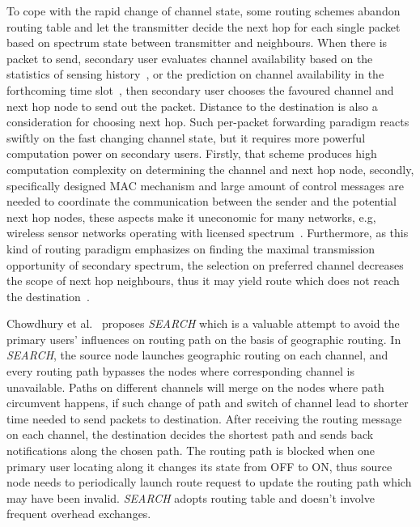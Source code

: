 To cope with the rapid change of channel state, some routing schemes abandon routing table and let the transmitter decide the next hop for each single packet based on spectrum state between transmitter and neighbours.
When there is packet to send, secondary user evaluates channel availability based on the statistics of sensing history~\cite{routing-crn-icc11}, or the prediction on channel availability in the forthcoming time slot~\cite{routing-crn-jsac12}, then secondary user chooses the favoured channel and next hop node to send out the packet.
Distance to the destination is also a consideration for choosing next hop.
Such per-packet forwarding paradigm reacts swiftly on the fast changing channel state, but it requires more powerful computation power on secondary users.
Firstly, that scheme produces high computation complexity on determining the channel and next hop node, secondly, specifically designed MAC mechanism and large amount of control messages are needed to coordinate the communication between the sender and the potential next hop nodes, these aspects make it uneconomic for many networks, e.g, wireless sensor networks operating with licensed spectrum~\cite{delay-cogwsn-2014}.
Furthermore, as this kind of routing paradigm emphasizes on finding the maximal transmission opportunity of secondary spectrum, the selection on preferred channel decreases the scope of next hop neighbours, thus it may yield route which does not reach the destination~\cite{commag-Khalife08, spectrumDecision_2013mass}.


Chowdhury et al.~\cite{search_geo_routing_chowdhury} proposes \textit{SEARCH} which is a valuable attempt to avoid the primary users' influences on routing path on the basis of geographic routing. 
In \textit{SEARCH}, the source node launches geographic routing on each channel, and every routing path bypasses the nodes where corresponding channel is unavailable.
Paths on different channels will merge on the nodes where path circumvent happens, if such change of path and switch of channel lead to shorter time needed to send packets to destination.
After receiving the routing message on each channel, the destination decides the shortest path and sends back notifications along the chosen path.
The routing path is blocked when one primary user locating along it changes its state from OFF to ON, thus source node needs to periodically launch route request to update the routing path which may have been invalid.
\textit{SEARCH} adopts routing table and doesn't involve frequent overhead exchanges.

